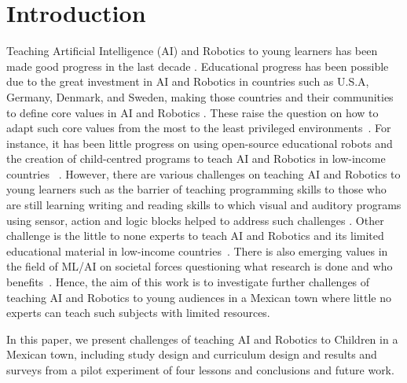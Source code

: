 \documentclass[sigconf,anonymous,review]{acmart}
\begin{document}
\section{Introduction}
Teaching Artificial Intelligence (AI) and Robotics to young learners has been made good progress in the last decade \cite{bers2019, druga2019}.
Educational progress has been possible due to the great investment in AI and Robotics in countries such as U.S.A, Germany, Denmark, and Sweden, making those countries and their communities to define core values in AI and Robotics \cite{druga2019}. These raise the question on 
how to adapt such core values from the most to the least privileged environments~\cite{pratyusha2020}. 
For instance, it has been little progress on using open-source  educational robots and the creation of child-centred programs to teach AI and Robotics in low-income countries ~\cite{abadilloperez2022_DEI_HRI2022, montenegro2021air4children}.
However, there are various challenges on teaching AI and Robotics to young learners such as the barrier of teaching programming skills to those who are still learning writing and reading skills to which visual and auditory programs using sensor, action and logic blocks helped to address such challenges \cite{long2020, wyeth2008}.
Other challenge is the little to none experts to teach AI and Robotics and its limited educational material in low-income countries~\cite{yang2022, abadilloperez2022_DEI_HRI2022}.
There is also emerging values in the field of ML/AI on societal forces questioning what research is done and who benefits~\cite{birhane2022}. 
Hence, the aim of this work is to
investigate further challenges of teaching AI and Robotics to young audiences in a Mexican town where little no experts can teach such subjects with limited resources.

In this paper, we present challenges of teaching AI and Robotics to Children in a Mexican town, including study design and curriculum design and results and surveys from a pilot experiment of four lessons and conclusions and future work.

%
%
\end{document}
